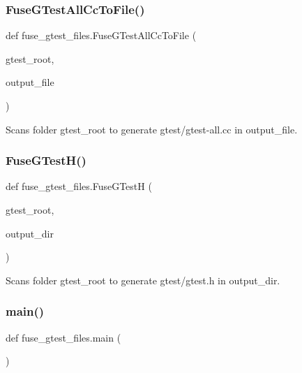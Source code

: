 \subsubsection{\texorpdfstring{Fuse\+G\+Test\+All\+Cc\+To\+File()}{FuseGTestAllCcToFile()}}
{\footnotesize\ttfamily def fuse\+\_\+gtest\+\_\+files.\+Fuse\+G\+Test\+All\+Cc\+To\+File (\begin{DoxyParamCaption}\item[{}]{gtest\+\_\+root,  }\item[{}]{output\+\_\+file }\end{DoxyParamCaption})}

\begin{DoxyVerb}Scans folder gtest_root to generate gtest/gtest-all.cc in output_file.\end{DoxyVerb}
 \mbox{\label{namespacefuse__gtest__files_a95685ab66129ced9d7b3db78e6001c8b}} 
\subsubsection{\texorpdfstring{Fuse\+G\+Test\+H()}{FuseGTestH()}}
{\footnotesize\ttfamily def fuse\+\_\+gtest\+\_\+files.\+Fuse\+G\+TestH (\begin{DoxyParamCaption}\item[{}]{gtest\+\_\+root,  }\item[{}]{output\+\_\+dir }\end{DoxyParamCaption})}

\begin{DoxyVerb}Scans folder gtest_root to generate gtest/gtest.h in output_dir.\end{DoxyVerb}
 \mbox{\label{namespacefuse__gtest__files_a5eaf924c10970f574e1b0459cbbda75a}} 
\subsubsection{\texorpdfstring{main()}{main()}}
{\footnotesize\ttfamily def fuse\+\_\+gtest\+\_\+files.\+main (\begin{DoxyParamCaption}{ }\end{DoxyParamCaption})}

